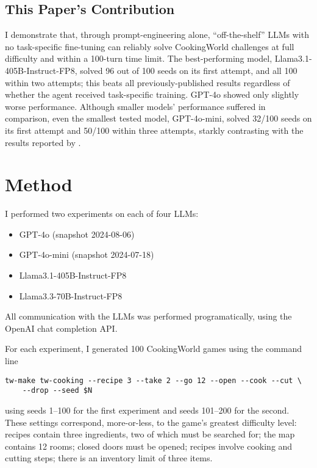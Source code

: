\documentclass{article}
\begin{document}
\subsection{This Paper's Contribution}

I demonstrate that, through prompt-engineering alone, ``off-the-shelf'' LLMs
with no task-specific fine-tuning can reliably solve CookingWorld challenges at
full difficulty and within a 100-turn time limit. The best-performing model,
Llama3.1-405B-Instruct-FP8, solved 96 out of 100 seeds on its first attempt, and
all 100 within two attempts; this beats all previously-published results
regardless of whether the agent received task-specific training. GPT-4o showed
only slightly worse performance. Although smaller models' performance suffered
in comparison, even the smallest tested model, GPT-4o-mini, solved 32/100 seeds
on its first attempt and 50/100 within three attempts, starkly contrasting with
the results reported by \autocite{Zhang2024PDDLEGOIP}.

\section{Method}
I performed two experiments on each of four LLMs:
\begin{itemize}
  \item GPT-4o (snapshot 2024-08-06) \autocite{OpenAI2024Gpt4o}
  \item GPT-4o-mini (snapshot 2024-07-18)
  \item Llama3.1-405B-Instruct-FP8 \autocite{Meta2024Llama}
  \item Llama3.3-70B-Instruct-FP8
\end{itemize}

All communication with the LLMs was performed programatically, using the OpenAI
chat completion API.

For each experiment, I generated 100 CookingWorld games using the command line
\begin{verbatim}
tw-make tw-cooking --recipe 3 --take 2 --go 12 --open --cook --cut \
    --drop --seed $N
\end{verbatim}
using seeds 1--100 for the first experiment and seeds
101--200 for the second. These settings correspond, more-or-less, to the game's
greatest difficulty level: recipes contain three ingredients, two of which must
be searched for; the map contains 12 rooms; closed doors must be opened; recipes
involve cooking and cutting steps; there is an inventory limit of three items.
\end{document}
